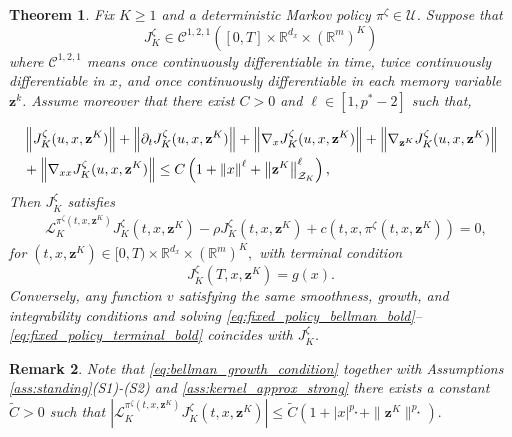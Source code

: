 \documentclass[11pt]{article}
\newtheorem{theorem}{Theorem}[section]
\theoremstyle{remarkitalic}
\theoremstyle{remarkitalic}
\newtheorem{remark}[theorem]{Remark}
\newcommand{\1}{\mathbf 1}
\newcommand{\norm}[1]{\left\lVert #1 \right\rVert}
\begin{document}
\begin{theorem}
\label{thm:fixed_policy_bellman}
Fix $K\ge1$ and a deterministic Markov policy
$ \pi^\zeta\in\mathcal U$.
Suppose that
\[
    J_K^\zeta
    \in
    \mathcal C^{1,2,1}
    \left(
        [0,T]\times
        \mathbb R^{d_x}\times(\mathbb R^m)^K
    \right)
\]
where $\mathcal C^{1,2,1}$ means once continuously differentiable in time,
twice continuously differentiable in $x$, and once continuously
differentiable in each memory variable $\mathbf z^k$. Assume moreover that there exist $C>0$ and $\ell \in [1,p^*-2]$ such that,

\begin{align}
    &\norm{J_K^\zeta(u,x,\mathbf z^K)}
    +
    \norm{
        \partial_t
        J_K^\zeta(u,x,\mathbf z^K)
    }
    +
    \norm{\nabla_x J_K^\zeta(u,x,\mathbf z^K)} + \norm{\nabla_{\mathbf z^K} J_K^\zeta(u,x,\mathbf z^K)} \notag \\
    &+ \norm{\nabla_{xx} J_K^\zeta(u,x,\mathbf z^K)}\le
    C
    \left(
        1+\norm{x}^{\ell}
        +\norm{\mathbf z^K}_{\mathcal Z_K}^{\ell}
    \right),
    \label{eq:bellman_growth_condition}
\end{align}
 Then $J_K^\zeta$ satisfies
\begin{align}
    &
    \mathcal L_K^{
        \pi^\zeta(t,x,\mathbf z^K)
    }
    J_K^\zeta(t,x,\mathbf z^K)
    -
    \rho J_K^\zeta(t,x,\mathbf z^K)
    +
    c\left(
        t,x,
        \pi^\zeta(t,x,\mathbf z^K)
    \right)
    =
    0,
    \label{eq:fixed_policy_bellman_bold}
\end{align}
for $(t,x,\mathbf z^K)
    \in
    [0,T)\times
    \mathbb R^{d_x}\times(\mathbb R^m)^K,$
with terminal condition
\begin{equation}
\label{eq:fixed_policy_terminal_bold}
    J_K^\zeta(T,x,\mathbf z^K)
    =
    g(x).
\end{equation} Conversely, any function $v$ satisfying the same smoothness,
growth, and integrability conditions and solving
\eqref{eq:fixed_policy_bellman_bold}--%
\eqref{eq:fixed_policy_terminal_bold}
coincides with $J_K^\zeta$.
\end{theorem}

\begin{remark}\label{rem:LK}
   Note that \eqref{eq:bellman_growth_condition} together with Assumptions \ref{ass:standing}(S1)-(S2) and \ref{ass:kernel_approx_strong} there exists a constant $\tilde C>0$ such that $|\mathcal L_K^{
        \pi^\zeta(t,x,\mathbf z^K)
    }
    J_K^\zeta(t,x,\mathbf z^K)|\leq \tilde C(1+|x|^{p_\star}+\|\mathbf z^K\|^{p_\star}).$
\end{remark}
    
\end{document}
